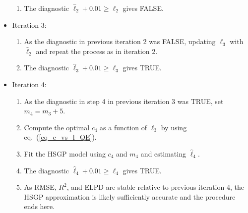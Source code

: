 \begin{itemize}
\begin{enumerate}
	\item The diagnostic $\hat{\ell}_2 + 0.01 \geq \ell_2$ gives FALSE.
	\end{enumerate}
	
\item[] Iteration 3:
	\begin{enumerate}
	\item As the diagnostic in previous iteration 2 was FALSE, updating $\ell_3$ with $\hat{\ell}_2$ and repeat the process as in iteration 2.
	
	\item The diagnostic $\hat{\ell}_3 + 0.01 \geq \ell_3$ gives TRUE.
	\end{enumerate}
	
\item[] Iteration 4:
	\begin{enumerate}
	\item As the diagnostic in step 4 in previous iteration 3 was TRUE, set $m_4 = m_3 + 5$.
	
	\item Compute the optimal $c_4$ as a function of $\ell_3$ by using eq.~(\ref{eq_c_vs_l_QE}).
	
	\item Fit the HSGP model using $c_4$ and $m_4$ and estimating $\hat{\ell}_4$.
	
	\item The diagnostic $\hat{\ell}_4 + 0.01 \geq \ell_4$ gives TRUE.
	
	\item As RMSE, $R^2$, and ELPD are stable relative to previous iteration 4, the HSGP approximation is likely sufficiently accurate and the procedure ends here.
	\end{enumerate}
	
\end{itemize} 

